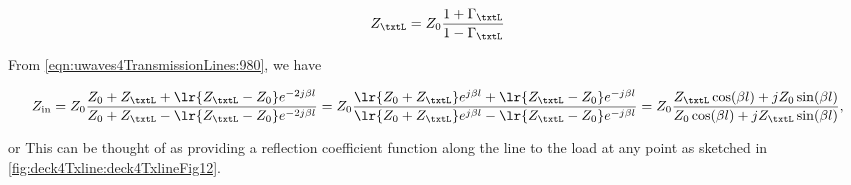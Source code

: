 \begin{dmath}\label{eqn:uwaves4TransmissionLinesCore:1420}
Z_\txtL
= Z_0 \frac{1 + \Gamma_\txtL}{1 - \Gamma_\txtL}
\end{dmath}

From \cref{eqn:uwaves4TransmissionLines:980}, we have

\begin{dmath}\label{eqn:uwaves4TransmissionLinesCore:1440}
Z_{\textrm{in}}
= Z_0 \frac{Z_0 + Z_\txtL + \lr{Z_\txtL - Z_0} e^{-2 j \beta l}}{Z_0 + Z_\txtL - \lr{Z_\txtL - Z_0} e^{-2 j \beta l}}
= Z_0 \frac{\lr{Z_0 + Z_\txtL} e^{j\beta l} + \lr{Z_\txtL - Z_0} e^{- j \beta l}}{\lr{Z_0 + Z_\txtL} e^{j\beta l} - \lr{Z_\txtL - Z_0} e^{- j \beta l}}
= Z_0
\frac
{Z_\txtL \cos( \beta l ) + j Z_0 \sin(\beta l ) }
{Z_0 \cos( \beta l ) + j Z_\txtL \sin(\beta l ) },
\end{dmath}

or
This can be thought of as providing a reflection coefficient function along the line to the load at any point as sketched in \cref{fig:deck4Txline:deck4TxlineFig12}.


